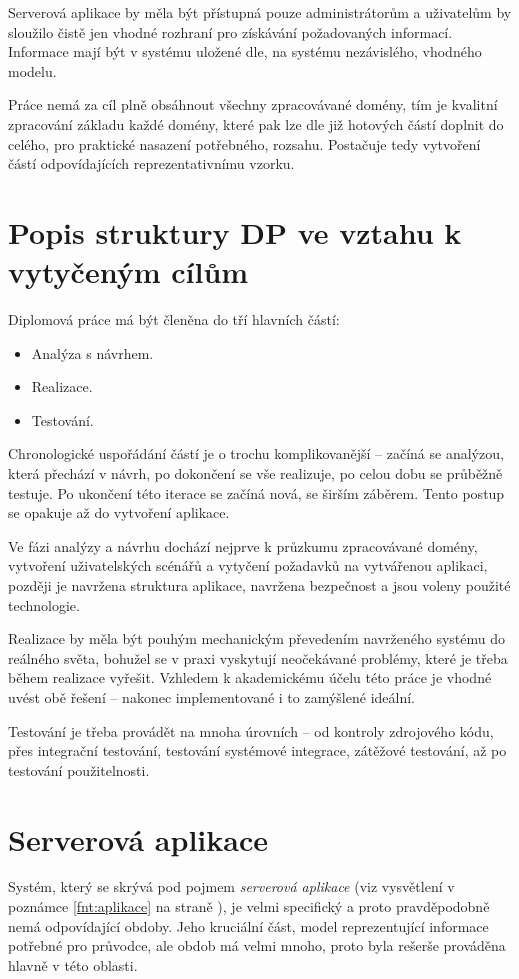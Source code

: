 Serverová aplikace by měla být přístupná pouze administrátorům a uživatelům by sloužilo čistě jen vhodné rozhraní pro získávání požadovaných informací. Informace mají být v systému uložené dle, na systému nezávislého, vhodného modelu.

Práce nemá za cíl plně obsáhnout všechny zpracovávané domény, tím je kvalitní zpracování základu každé domény, které pak lze dle již hotových částí doplnit do celého, pro praktické nasazení potřebného, rozsahu. Postačuje tedy vytvoření částí odpovídajících reprezentativnímu vzorku.


\section{Popis struktury DP ve vztahu k vytyčeným cílům}
Diplomová práce má být členěna do tří hlavních částí:
\begin{itemize}
 \item Analýza s návrhem.
 \item Realizace.
 \item Testování.
\end{itemize}
Chronologické uspořádání částí je o trochu komplikovanější -- začíná se analýzou, která přechází v návrh, po dokončení se vše realizuje, po celou dobu se průběžně testuje. Po ukončení této iterace se začíná nová, se širším záběrem. Tento postup se opakuje až do vytvoření aplikace.

Ve fázi analýzy a návrhu dochází nejprve k průzkumu zpracovávané domény, vytvoření uživatelských scénářů a vytyčení požadavků na vytvářenou aplikaci, později je navržena struktura aplikace, navržena bezpečnost a jsou voleny použité technologie.

Realizace by měla být pouhým mechanickým převedením navrženého systému do reálného světa, bohužel se v praxi vyskytují neočekávané problémy, které je třeba během realizace vyřešit. Vzhledem k akademickému účelu této práce je vhodné uvést obě řešení -- nakonec implementované i to zamýšlené ideální.

Testování je třeba provádět na mnoha úrovních -- od kontroly zdrojového kódu, přes integrační testování, testování systémové integrace, zátěžové testování, až po testování použitelnosti.


\section{Serverová aplikace}
Systém, který se skrývá pod pojmem \textit{serverová aplikace} (viz vysvětlení v poznámce \ref{fnt:aplikace} na straně \pageref{fnt:aplikace}), je velmi specifický a proto pravděpodobně nemá odpovídající obdoby. Jeho kruciální část, model reprezentující informace potřebné pro průvodce, ale obdob má velmi mnoho, proto byla rešerše prováděna hlavně v této oblasti.

